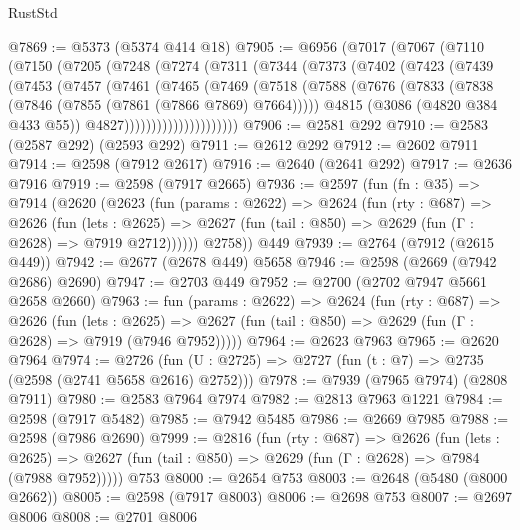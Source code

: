 \begin{lexlean}{RustStd}
\begin{coremodule}
@7869 := @5373 (@5374 @414 @18)
@7905 := @6956
    (@7017
      (@7067
        (@7110
          (@7150
            (@7205
              (@7248
                (@7274
                  (@7311
                    (@7344
                      (@7373
                        (@7402
                          (@7423
                            (@7439
                              (@7453
                                (@7457
                                  (@7461
                                    (@7465
                                      (@7469
                                        (@7518
                                          (@7588
                                            (@7676
                                              (@7833
                                                (@7838 (@7846 (@7855 (@7861 (@7866 @7869) @7664)))))
                                              @4815
                                              (@3086 (@4820 @384 @433 @55))
                                              @4827)))))))))))))))))))))
@7906 := @2581 @292
@7910 := @2583 (@2587 @292) (@2593 @292)
@7911 := @2612 @292
@7912 := @2602 @7911
@7914 := @2598 (@7912 @2617)
@7916 := @2640 (@2641 @292)
@7917 := @2636 @7916
@7919 := @2598 (@7917 @2665)
@7936 := @2597
    (fun (fn : @35) =>
    @7914
      (@2620
        (@2623
          (fun (params : @2622) =>
          @2624
            (fun (rty : @687) =>
            @2626
              (fun (lets : @2625) =>
              @2627 (fun (tail : @850) => @2629 (fun (Γ : @2628) => @7919 @2712))))))
        @2758))
    @449
@7939 := @2764 (@7912 (@2615 @449))
@7942 := @2677 (@2678 @449) @5658
@7946 := @2598 (@2669 (@7942 @2686) @2690)
@7947 := @2703 @449
@7952 := @2700 (@2702 @7947 @5661 @2658 @2660)
@7963 := fun (params : @2622) =>
  @2624
    (fun (rty : @687) =>
    @2626
      (fun (lets : @2625) =>
      @2627 (fun (tail : @850) => @2629 (fun (Γ : @2628) => @7919 (@7946 @7952)))))
@7964 := @2623 @7963
@7965 := @2620 @7964
@7974 := @2726 (fun (U : @2725) => @2727 (fun (t : @7) => @2735 (@2598 (@2741 @5658 @2616) @2752)))
@7978 := @7939 (@7965 @7974) (@2808 @7911)
@7980 := @2583 @7964 @7974
@7982 := @2813 @7963 @1221
@7984 := @2598 (@7917 @5482)
@7985 := @7942 @5485
@7986 := @2669 @7985
@7988 := @2598 (@7986 @2690)
@7999 := @2816
    (fun (rty : @687) =>
    @2626
      (fun (lets : @2625) =>
      @2627 (fun (tail : @850) => @2629 (fun (Γ : @2628) => @7984 (@7988 @7952)))))
    @753
@8000 := @2654 @753
@8003 := @2648 (@5480 (@8000 @2662))
@8005 := @2598 (@7917 @8003)
@8006 := @2698 @753
@8007 := @2697 @8006
@8008 := @2701 @8006

\end{coremodule}
\end{lexlean}

